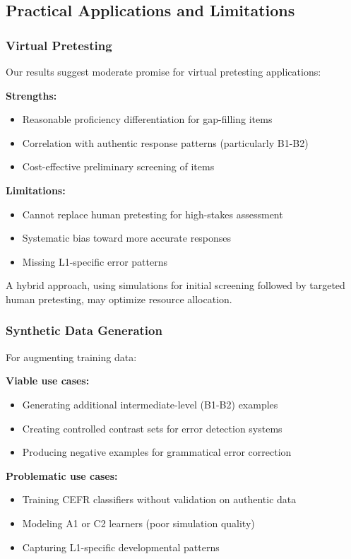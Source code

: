 \subsection{Practical Applications and Limitations}

\subsubsection{Virtual Pretesting}

Our results suggest moderate promise for virtual pretesting applications:

\textbf{Strengths:}
\begin{itemize}
    \item Reasonable proficiency differentiation for gap-filling items
    \item Correlation with authentic response patterns (particularly B1-B2)
    \item Cost-effective preliminary screening of items
\end{itemize}

\textbf{Limitations:}
\begin{itemize}
    \item Cannot replace human pretesting for high-stakes assessment
    \item Systematic bias toward more accurate responses
    \item Missing L1-specific error patterns
\end{itemize}

A hybrid approach, using simulations for initial screening followed by targeted human pretesting, may optimize resource allocation.

\subsubsection{Synthetic Data Generation}

For augmenting training data:

\textbf{Viable use cases:}
\begin{itemize}
    \item Generating additional intermediate-level (B1-B2) examples
    \item Creating controlled contrast sets for error detection systems
    \item Producing negative examples for grammatical error correction
\end{itemize}

\textbf{Problematic use cases:}
\begin{itemize}
    \item Training CEFR classifiers without validation on authentic data
    \item Modeling A1 or C2 learners (poor simulation quality)
    \item Capturing L1-specific developmental patterns
\end{itemize}

